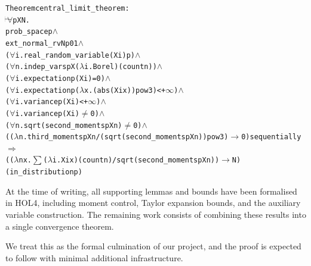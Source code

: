\begin{hol}
  \begin{alltt}
    Theorem central\_limit\_theorem :
    \(\!\!\!{\turn}\!\!\!\!\) \(\forall\)p X N.
    prob\_space p \(\land\)
    ext\_normal\_rv N p 0 1 \(\land\)
    (\(\forall\)i. real\_random\_variable (X i) p) \(\land\)
    (\(\forall\)n. indep\_vars p X (\(\lambda\)i. Borel) (count n)) \(\land\)
    (\(\forall\)i. expectation p (X i) = 0) \(\land\)
    (\(\forall\)i. expectation p (\(\lambda\)x. (abs (X i x)) pow 3) < +\(\infty\)) \(\land\)
    (\(\forall\)i. variance p (X i) < +\(\infty\)) \(\land\)
    (\(\forall\)i. variance p (X i) \(\ne\) 0) \(\land\)
    (\(\forall\)n. sqrt (second\_moments p X n) \(\ne\) 0) \(\land\)
    ((\(\lambda\)n. third\_moments p X n / (sqrt (second\_moments p X n)) pow 3) \(\longrightarrow\) 0) sequentially
    \(\Rightarrow\)
    ((\(\lambda\)n x. \(\sum\) (\(\lambda\)i. X i x) (count n) / sqrt (second\_moments p X n)) \(\longrightarrow\) N)
    (in\_distribution p)
  \end{alltt}
\end{hol}


\medskip

At the time of writing, all supporting lemmas and bounds have been formalised in HOL4, including moment control, Taylor expansion bounds, and the auxiliary variable construction. The remaining work consists of combining these results into a single convergence theorem.

We treat this as the formal culmination of our project, and the proof is expected to follow with minimal additional infrastructure.
